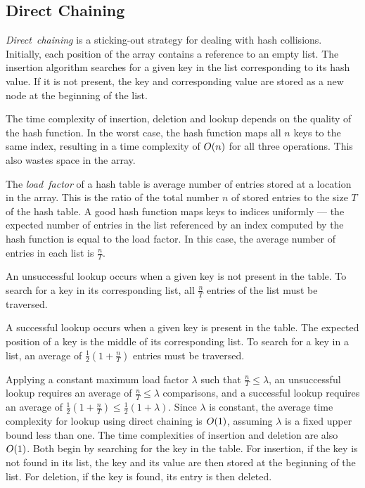 \subsection{Direct Chaining}

\emph{Direct~chaining} is a sticking-out strategy for dealing with hash collisions.
Initially, each position of the array contains a reference to an empty list.
The insertion algorithm searches for a given key in the list corresponding to its hash value.
If it is not present, the key and corresponding value are stored as a new node at the beginning of the list.

The time complexity of insertion, deletion and lookup depends on the quality of the hash function.
In the worst case, the hash function maps all \( n \) keys to the same index, resulting in a time complexity of \( O\!\left(n\right) \) for all three operations.
This also wastes space in the array.

The \emph{load~factor} of a hash table is average number of entries stored at a location in the array.
This is the ratio of the total number \( n \) of stored entries to the size \( T \) of the hash table.
A good hash function maps keys to indices uniformly --- the expected number of entries in the list referenced by an index computed by the hash function is equal to the load factor.
In this case, the average number of entries in each list is \( \frac{n}{T} \).

An unsuccessful lookup occurs when a given key is not present in the table.
To search for a key in its corresponding list, all \( \frac{n}{T} \) entries of the list must be traversed.

A successful lookup occurs when a given key is present in the table.
The expected position of a key is the middle of its corresponding list.
To search for a key in a list, an average of \( \frac{1}{2} \left( 1 + \frac{n}{T} \right) \) entries must be traversed.

Applying a constant maximum load factor \( \lambda \) such that \( \frac{n}{T} \leq \lambda \), an unsuccessful lookup requires an average of \( \frac{n}{T} \leq \lambda \) comparisons, and a successful lookup requires an average of \( \frac{1}{2} \left( 1 + \frac{n}{T} \right) \leq \frac{1}{2} \left( 1 + \lambda \right) \).
Since \( \lambda \) is constant, the average time complexity for lookup using direct chaining is \( O\!\left(1\right) \), assuming \( \lambda \) is a fixed upper bound less than one.
The time complexities of insertion and deletion are also \( O\!\left(1\right) \).
Both begin by searching for the key in the table.
For insertion, if the key is not found in its list, the key and its value are then stored at the beginning of the list.
For deletion, if the key is found, its entry is then deleted.

